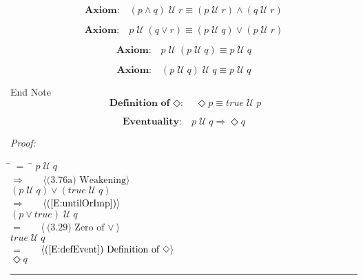 \documentclass[fleqn, leqno]{article}
\newcommand{\lgap}{2pt}                             %
\newcommand{\mymathindent}{24pt}                      %
\newcommand{\until}{\;\mathcal{U}\;}
\newcommand{\event}{\Diamond}
\newcommand{\myqed}{\hfill\rule[-.23ex]{1.2ex}{2.0ex}}
\newcommand{\Gll} {\langle}                         %
\newcommand{\Ggg} {\rangle}                         %
\newcommand{\Hint}[1]     {\ \ \ $\Gll              \mbox{#1} \Ggg$ }   %
\begin{document}
\begin{equation}\label{E:untilAndEquiv}
\textbf{Axiom:}\quad (p \land q) \until r \equiv (p \until r) \land (q \until r)
\end{equation}

\begin{equation}\label{E:untilOrEquiv}
\textbf{Axiom:}\quad p \until (q \lor r) \equiv (p \until q) \lor (p \until r)
\end{equation}

\begin{equation}\label{E:untilIdem}
\textbf{Axiom:}\quad p \until (p \until q) \equiv p \until q
\end{equation}

\begin{equation}\label{E:untilIdemR}
\textbf{Axiom:}\quad (p \until q) \until q \equiv p \until q
\end{equation}

End Note\\

\begin{equation}\label{E:defEvent}
\textbf{Definition of $\event$:}\quad \event p \equiv true \until p
\end{equation}

\begin{equation}\label{E:eventuality}
\textbf{Eventuality:}\quad p \until q \Rightarrow \event q
\end{equation}

\emph{Proof:}
\begin{tabbing}
\hspace{\mymathindent} \= $= \;$ \= \kill
  \> \>   $p \until q$\\[\lgap]
  \> $\Rightarrow$  \>  \Hint{(3.76a) Weakening}\\[\lgap]
  \> \>   $(p \until q) \lor (true \until q)$\\[\lgap]
  \> $\Rightarrow$  \>  \Hint{(\ref{E:untilOrImp})}\\[\lgap]
  \> \>   $(p \lor true) \until q$\\[\lgap]
  \> $=$  \>  \Hint{(3.29) Zero of $\lor$}\\[\lgap]
  \> \>   $true \until q$\\[\lgap]
  \> $=$  \>  \Hint{(\ref{E:defEvent}) Definition of $\event$}\\[\lgap]
  \> \>   $\event q$\\[\lgap]
\end{tabbing}
\myqed\\[\lgap]
\end{document}
